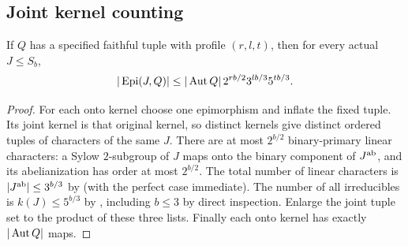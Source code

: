 \subsection{Joint kernel counting}
\begin{proposition}\label{prop:character-count}
If $Q$ has a specified faithful tuple with profile $(r,l,t)$, then
for every actual $J\leq S_b$,
\begin{equation}\label{eq:character-count}
 |\operatorname{Epi}(J,Q)|\leq|\operatorname{Aut} Q|\,2^{rb/2}3^{lb/3}5^{tb/3}.
\end{equation}
\end{proposition}
\begin{proof}
For each onto kernel choose one epimorphism and inflate the fixed
tuple. Its joint kernel is that original kernel, so distinct kernels
give distinct ordered tuples of characters of the same $J$.
There are at most $2^{b/2}$ binary-primary linear characters: a Sylow
$2$-subgroup of $J$ maps onto the binary component of $J^{\rm ab}$,
and its abelianization has order at most $2^{b/2}$.
The total number of linear characters is $|J^{\rm ab}|\leq3^{b/3}$
by \cite[Theorem 2.8]{RoneyDougalTracey2025} (with the perfect case
immediate). The number of all irreducibles is
$k(J)\leq5^{b/3}$ by \cite[Theorem 1.1]{GaronziMaroti2015}, including
$b\leq3$ by direct inspection. Enlarge the joint tuple set to the
product of these three lists. Finally each onto kernel has exactly
$|\operatorname{Aut} Q|$ maps.
\end{proof}

